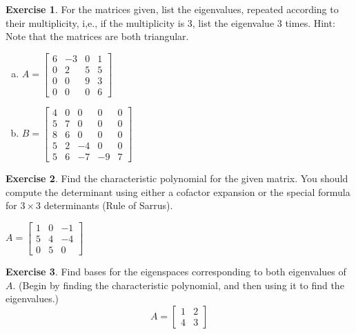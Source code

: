\documentclass[10pt]{book}
\theoremstyle{definition}
\newtheorem{exercise}{Exercise}[section]
\begin{document}
\begin{exercise} %
	For the matrices given, list the eigenvalues, repeated according to their multiplicity, i,e., if the multiplicity is 3, list the eigenvalue 3 times. Hint: Note that the matrices are both triangular.
	\begin{multicols}{2}
		\begin{enumerate}[(a)]
			\item $ A= \begin{bmatrix}6&-3&0&1\\0&2&5&5\\0&0&9&3\\0&0&0&6\end{bmatrix} $
			\item $ B= \begin{bmatrix}4&0&0&0&0\\5&7&0&0&0\\8&6&0&0&0\\5&2&-4&0&0\\5&6&-7&-9&7\end{bmatrix} $
		\end{enumerate}
	\end{multicols}
\end{exercise}
\vspace{.5in}


\newpage


\begin{exercise} %
	Find the characteristic polynomial for the given matrix. You should compute the determinant using either a cofactor expansion or the special formula for $3\times 3$ determinants (Rule of Sarrus).
	
	$ A = \begin{bmatrix}1&0&-1\\5&4&-4\\0&5&0\end{bmatrix} $
\end{exercise}
\vfill


\begin{exercise} %
	Find bases for the eigenspaces corresponding to both eigenvalues of $A$. (Begin by finding the characteristic polynomial, and then using it to find the eigenvalues.)
	$$ A=\begin{bmatrix}1&2\\4&3\end{bmatrix} $$
\end{exercise}
\vfill
\end{document}

